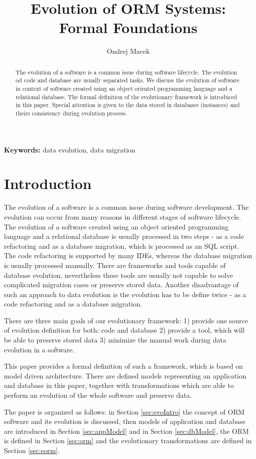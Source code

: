 \documentclass[11pt]{article}
\title{Evolution of ORM Systems: Formal Foundations}
\author{Ondrej Macek}
\begin{document}
\maketitle
\begin{abstract}
The evolution of a software is a common issue during software lifecycle. The evolution od code and database are usually separated tasks. We discuss the evolution of software in context of  software created using an object oriented programming language and a relational database. The formal definition of the evolutionary framework is introduced in this paper. Special attention is given to the data stored in databases (instances) and theirs consistency during evolution process.
\end{abstract}

\textbf{Keywords:} data evolution, data migration
\section{Introduction}
The evolution of a software is a common issue during software development. The evolution can occur from many reasons in different stages of software lifecycle. The evolution of a software created using an object oriented programming language and a relational database is usually processed in two steps - as a code refactoring and as a database migration, which is processed as an SQL script. The code refactoring is supported by many IDEs, whereas the database migration is usually processed manually. There are frameworks and tools capable of database evolution, nevertheless these tools are usually not capable to solve complicated migration cases or preserve stored data. Another disadvantage of such an approach to data evolution is the evolution has to be define twice - as a code refactoring and as a database migration.

There are three main goals of our evolutionary framework: 1) provide one source of evolution definition for both: code and database 2) provide a tool, which will be able to preserve stored data 3) minimize the manual work during data evolution in a software.

This paper provides a formal definition of such a framework, which is based on model driven architecture. There are defined models representing an application and database in this paper, together with transformations which are able to perform an evolution of the whole software and preserve data.

The paper is organized as follows: in Section \ref{sec:evoIntro} the concept of ORM software and its evolution is discussed, then models of application and database are introduced in Section \ref{sec:appModel} and in Section \ref{sec:dbModel}, the ORM is defined in Section \ref{sec:orm} and the evolutionary transformations are defined in Section \ref{sec:eorm}.
\end{document}
